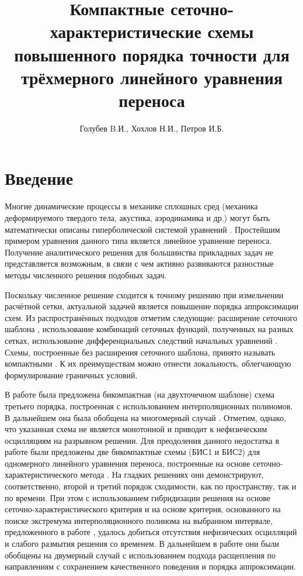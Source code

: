 \documentclass[11pt]{article}
\title{Компактные сеточно-характеристические схемы повышенного порядка точности для трёхмерного линейного уравнения переноса}
\date{}
\author{Голубев B.И., Хохлов Н.И., Петров И.Б.}
\begin{document}
\maketitle

\section{Введение}

Многие динамические процессы в механике сплошных сред (механика деформируемого твердого тела, акустика, аэродинамика и др.) могут быть математически описаны гиперболической системой уравнений \cite{Kholodov2008}.
Простейшим примером уравнения данного типа является линейное уравнение переноса.
Получение аналитического решения для большинства прикладных задач не представляется возможным, в связи с чем активно развиваются разностные методы численного решения подобных задач.

Поскольку численное решение сходится к точному решению при измельчении расчётной сетки, актуальной задачей является повышение порядка аппроксимации схем.
Из распространённых подходов отметим следующие: расширение сеточного шаблона \cite{Rusanov1961}, использование комбинаций сеточных функций, полученных на разных сетках,
использование дифференциальных следствий начальных уравнений \cite{Khol2006, Grudnizki1977, Petuhov1964}.
Схемы, построенные без расширения сеточного шаблона, принято называть компактными \cite{Tolstih1990, Rogov2011}.
К их преимуществам можно отнести локальность, облегчающую формулирование граничных условий.

В работе \cite{Yabe1991} была предложена бикомпактная (на двухточечном шаблоне) схема третьего порядка, построенная с использованием интерполяционных полиномов.
В дальнейшем она была обобщена на многомерный случай \cite{Yabe2004}.
Отметим, однако, что указанная схема не является монотонной и приводит к нефизическим осцилляциям на разрывном решении.
Для преодоления данного недостатка в работе \cite{Khokhlov1D2014} были предложены две бикомпактные схемы (БИС1 и БИС2) для одномерного
линейного уравнения переноса, построенные на основе сеточно-характеристического метода \cite{Magometov-Kholodov-1969}.
На гладких решениях они демонстрируют, соответственно, второй и третий порядок сходимости, как по пространству, так и по времени.
При этом с использованием гибридизации решения \cite{petrov1984} на основе сеточно-характеристического критерия \cite{van1979} и на основе критерия,
основанного на поиске экстремума интерполяционного полинома на выбранном интервале, предложенного в работе \cite{Khokhlov1D2014},
удалось добиться отсутствия нефизических осцилляций и слабого размытия решения со временем.
В дальнейшем в работе \cite{Golubev2D2014} они были обобщены на двумерный случай с использованием подхода расщепления по направлениям с сохранением качественного поведения и порядка аппроксимации.
\end{document}
